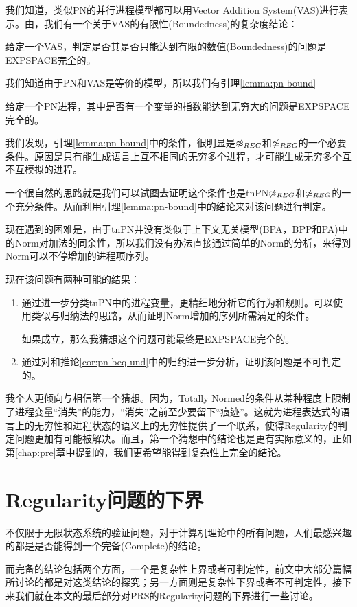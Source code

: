 我们知道，类似PN的并行进程模型都可以用Vector Addition System(VAS)进行表示。由\cite{Rackoff1978,Cardoza1976}，我们有一个关于VAS的有限性(Boundedness)的复杂度结论：

\begin{lem}\label{lemma:vas}
给定一个VAS，判定是否其是否只能达到有限的数值(Boundedness)的问题是EXPSPACE完全的。
\end{lem}

我们知道由于PN和VAS是等价的模型，所以我们有引理\ref{lemma:pn-bound}

\begin{lem}\label{lemma:pn-bound}
给定一个PN进程，其中是否有一个变量的指数能达到无穷大的问题是EXPSPACE完全的。
\end{lem}

我们发现，引理\ref{lemma:pn-bound}中的条件，很明显是$\not\approx_{REG}$和$\not\simeq_{REG}$的一个必要条件。原因是只有能生成语言上互不相同的无穷多个进程，才可能生成无穷多个互不互模拟的进程。

一个很自然的思路就是我们可以试图去证明这个条件也是tnPN$\not\approx_{REG}$和$\not\simeq_{REG}$的一个充分条件。从而利用引理\ref{lemma:pn-bound}中的结论来对该问题进行判定。

现在遇到的困难是，由于tnPN并没有类似于上下文无关模型(BPA，BPP和PA)中的Norm对加法的同余性，所以我们没有办法直接通过简单的Norm的分析，来得到Norm可以不停增加的进程项序列。

现在该问题有两种可能的结果：

\begin{enumerate}
	\item 通过进一步分类tnPN中的进程变量，更精细地分析它的行为和规则。可以使用类似与归纳法的思路，从而证明Norm增加的序列所需满足的条件。

如果成立，那么我猜想这个问题可能最终是EXPSPACE完全的。
	\item 通过对\cite{Jancar1996}和推论\ref{cor:pn-beq-und}中的归约进一步分析，证明该问题是不可判定的。
\end{enumerate}

我个人更倾向与相信第一个猜想。因为，Totally Normed的条件从某种程度上限制了进程变量``消失''的能力，``消失''之前至少要留下``痕迹''。这就为进程表达式的语言上的无穷性和进程状态的语义上的无穷性提供了一个联系，使得Regularity的判定问题更加有可能被解决。而且，第一个猜想中的结论也是更有实际意义的，正如第\ref{chap:pre}章中提到的，我们更希望能得到复杂性上完全的结论。


\section{Regularity问题的下界}
\label{sec:lower-bound}

不仅限于无限状态系统的验证问题，对于计算机理论中的所有问题，人们最感兴趣的都是是否能得到一个完备(Complete)的结论。

而完备的结论包括两个方面，一个是复杂性上界或者可判定性，前文中大部分篇幅所讨论的都是对这类结论的探究；另一方面则是复杂性下界或者不可判定性，接下来我们就在本文的最后部分对PRS的Regularity问题的下界进行一些讨论。


